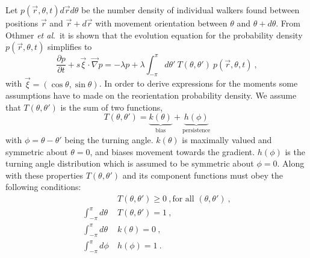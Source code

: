 Let $p(\vec{r},\theta,t) d\vec{r} d\theta$ be the number density of individual walkers found between positions $\vec{r}$ and $\vec{r}+d\vec{r}$ with movement orientation between $\theta$ and $\theta + d\theta$. From Othmer \textit{et al}.\ it is shown that the evolution equation for the probability density $p(\vec{r},\theta,t)$ simplifies to
\begin{equation} \label{eq:p1}
    \frac{\partial p}{\partial t} + s \vec{\xi}\cdot\vec{\nabla} p =
    -\lambda p + \lambda \int_{-\pi}^{\pi} d\theta' \ T(\theta,\theta') \ p(\vec{r},\theta,t) \ ,
\end{equation}
with $\vec{\xi} = (\cos\theta,\sin\theta)$. In order to derive expressions for the moments some assumptions have to made on the reorientation probability density. We assume that $T(\theta,\theta')$ is the sum of two functions,
\begin{equation} \label{eq:t1}
    T(\theta,\theta') = \underbrace{k(\theta)}_\text{bias}
    + \underbrace{h(\phi)}_\text{persistence}
\end{equation}
with $\phi = \theta - \theta'$ being the turning angle. $k(\theta)$ is maximally valued and symmetric about $\theta = 0$, and biases movement towards the gradient. $h(\phi)$ is the turning angle distribution which is assumed to be symmetric about $\phi = 0$. Along with these properties $T(\theta,\theta')$ and its component functions must obey the following conditions:
\begin{align} \label{eq:t2}
    &T(\theta,\theta') \geq 0 \ , \text{for all } (\theta,\theta') \ , \\
    \int_{-\pi}^{\pi} d\theta \ &T(\theta,\theta') = 1 \ , \label{eq:t3} \\
    \int_{-\pi}^{\pi} d\theta  \ &k(\theta)         = 0 \ , \label{eq:t4} \\
    \int_{-\pi}^{\pi} d\phi    \ &h(\phi)           = 1 \ . \label{eq:t5}
\end{align}

